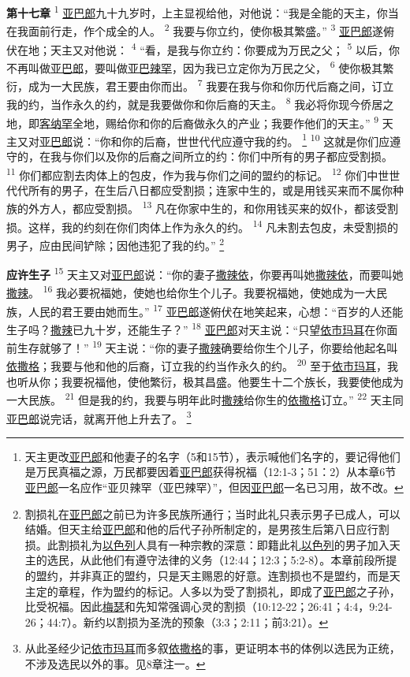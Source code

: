 \textbf{第十七章\quad}
\textsuperscript{1}
\uline{亚巴郎}九十九岁时，上主显视给他，对他说：“我是全能的天主，你当在我面前行走，作个成全的人。
\textsuperscript{2}
我要与你立约，使你极其繁盛。”
\textsuperscript{3}
\uline{亚巴郎}遂俯伏在地；天主又对他说：
\textsuperscript{4}
“看，是我与你立约：你要成为万民之父；
\textsuperscript{5}
以后，你不再叫做\uline{亚巴郎}，要叫做\uline{亚巴辣罕}，因为我已立定你为万民之父，
\textsuperscript{6}
使你极其繁衍，成为一大民族，君王要由你而出。
\textsuperscript{7}
我要在我与你和你历代后裔之间，订立我的约，当作永久的约，就是我要做你和你后裔的天主。
\textsuperscript{8}
我必将你现今侨居之地，即\uline{客纳罕}全地，赐给你和你的后裔做永久的产业；我要作他们的天主。”
\textsuperscript{9}
天主又对\uline{亚巴郎}说：“你和你的后裔，世世代代应遵守我的约。
\footnote{天主更改\uline{亚巴郎}和他妻子的名字（5和15节），表示喊他们名字的，要记得他们是万民真福之源，万民都要因着\uline{亚巴郎}获得祝福（12:1-3；51：2）从本章6节\uline{亚巴郎}一名应作“亚贝辣罕（亚巴辣罕）”，但因\uline{亚巴郎}一名已习用，故不改。}
\textsuperscript{10}
这就是你们应遵守的，在我与你们以及你的后裔之间所立的约：你们中所有的男子都应受割损。
\textsuperscript{11}
你们都应割去肉体上的包皮，作为我与你们之间的盟约的标记。
\textsuperscript{12}
你们中世世代代所有的男子，在生后八日都应受割损；连家中生的，或是用钱买来而不属你种族的外方人，都应受割损。
\textsuperscript{13}
凡在你家中生的，和你用钱买来的奴仆，都该受割损。这样，我的约刻在你们肉体上作为永久的约。
\textsuperscript{14}
凡未割去包皮，未受割损的男子，应由民间铲除；因他违犯了我的约。”
\footnote{割损礼在\uline{亚巴郎}之前已为许多民族所通行；当时此礼只表示男子已成人，可以结婚。但天主给\uline{亚巴郎}和他的后代子孙所制定的，是男孩生后第八日应行割损。此割损礼为\uline{以色列}人具有一种宗教的深意：即籍此礼\uline{以色列}的男子加入天主的选民，从此他们有遵守法律的义务（12:44；12:3；5:2-8）。本章前段所提的盟约，并非真正的盟约，只是天主赐恩的好意。连割损也不是盟约，而是天主定的章程，作为盟约的标记。人多以为受了割损礼，即成了\uline{亚巴郎}之子孙，比受祝福。因此\uline{梅瑟}和先知常强调心灵的割损（10:12-22；26:41；4:4，9:24-26；44:7）。新约以割损为圣洗的预象（3:3；2:11；前3:21）。}

\textbf{应许生子\quad}
\textsuperscript{15}
天主又对\uline{亚巴郎}说：“你的妻子\uline{撒辣依}，你要再叫她\uline{撒辣依}，而要叫她\uline{撒辣}。
\textsuperscript{16}
我必要祝福她，使她也给你生个儿子。我要祝福她，使她成为一大民族，人民的君王要由她而生。”
\textsuperscript{17}
\uline{亚巴郎}遂俯伏在地笑起来，心想：“百岁的人还能生子吗？\uline{撒辣}已九十岁，还能生子？”
\textsuperscript{18}
\uline{亚巴郎}对天主说：“只望\uline{依市玛耳}在你面前生存就够了！”
\textsuperscript{19}
天主说：“你的妻子\uline{撒辣}确要给你生个儿子，你要给他起名叫\uline{依撒格}；我要与他和他的后裔，订立我的约当作永久的约。
\textsuperscript{20}
至于\uline{依市玛耳}，我也听从你；我要祝福他，使他繁衍，极其昌盛。他要生十二个族长，我要使他成为一大民族。
\textsuperscript{21}
但是我的约，我要与明年此时\uline{撒辣}给你生的\uline{依撒格}订立。”
\textsuperscript{22}
天主同\uline{亚巴郎}说完话，就离开他上升去了。
\footnote{从此圣经少记\uline{依市玛耳}而多叙\uline{依撒格}的事，更证明本书的体例以选民为正统，不涉及选民以外的事。见8章注一。}

